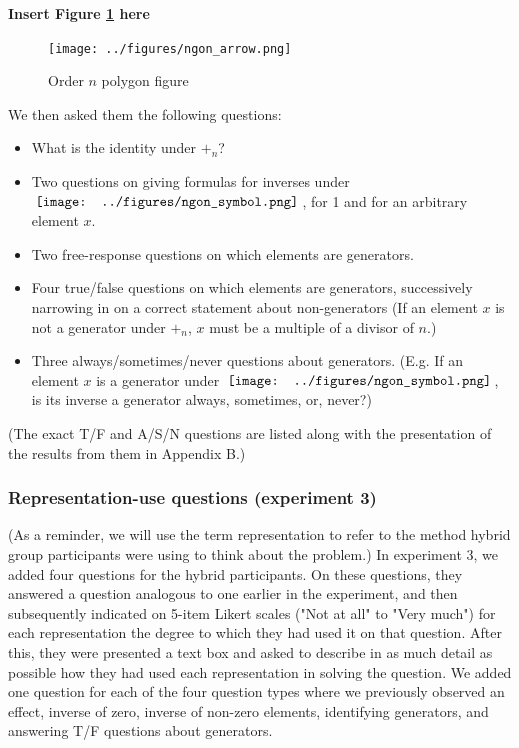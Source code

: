 \documentclass[man,10pt]{apa6}
\newcommand{\ngon}{\,\vcenter{\hbox{\texttt{[image: ../figures/ngon\_symbol.png]}}}\,}
\begin{document}
\begin{center} 
{\bf Insert Figure \ref{ngonex} here} 
\end{center}
\begin{figure} \centering \texttt{[image: ../figures/ngon\_arrow.png]} \caption{Order $n$ polygon figure} \label{ngonex} 
\end{figure}
\noindent
We then asked them the following questions: 
\begin{itemize}
\item What is the identity under $+_n$?
\item Two questions on giving formulas for inverses under $\ngon$, for 1 and for an arbitrary element $x$.
\item Two free-response questions on which elements are generators. 
\item Four true/false questions on which elements are generators, successively narrowing in on a correct statement about non-generators (If an element $x$ is not a generator under $+_n$, $x$ must be a multiple of a divisor of $n$.)
\item Three always/sometimes/never questions about generators. (E.g. If an element $x$ is a generator under $\ngon$, is its inverse a generator always, sometimes, or, never?) 
\end{itemize}
(The exact T/F and A/S/N questions are listed along with the presentation of the results from them in Appendix B.)
\subsubsection{Representation-use questions (experiment 3)}
(As a reminder, we will use the term representation to refer to the method hybrid group participants were using to think about the problem.) In experiment 3, we added four questions for the hybrid participants. On these questions, they answered a question analogous to one earlier in the experiment, and then subsequently indicated on 5-item Likert scales ("Not at all" to "Very much") for each representation the degree to which they had used it on that question. After this, they were presented a text box and asked to describe in as much detail as possible how they had used each representation in solving the question. We added one question for each of the four question types where we previously observed an effect, inverse of zero, inverse of non-zero elements, identifying generators, and answering T/F questions about generators.
\end{document}
